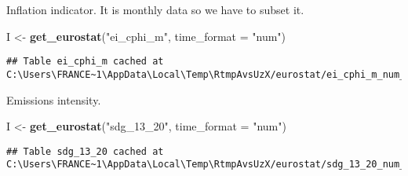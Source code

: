 \documentclass[
]{article}
\newenvironment{Shaded}{\begin{snugshade}}{\end{snugshade}}
\newcommand{\DataTypeTok}[1]{\textcolor[rgb]{0.13,0.29,0.53}{#1}}
\newcommand{\DecValTok}[1]{\textcolor[rgb]{0.00,0.00,0.81}{#1}}
\newcommand{\KeywordTok}[1]{\textcolor[rgb]{0.13,0.29,0.53}{\textbf{#1}}}
\newcommand{\NormalTok}[1]{#1}
\newcommand{\OperatorTok}[1]{\textcolor[rgb]{0.81,0.36,0.00}{\textbf{#1}}}
\newcommand{\OtherTok}[1]{\textcolor[rgb]{0.56,0.35,0.01}{#1}}
\newcommand{\StringTok}[1]{\textcolor[rgb]{0.31,0.60,0.02}{#1}}
\begin{document}
Inflation indicator. It is monthly data so we have to subset it.

\begin{Shaded}
\begin{Highlighting}[]
\NormalTok{I \textless{}{-}}\StringTok{ }\KeywordTok{get\_eurostat}\NormalTok{(}\StringTok{"ei\_cphi\_m"}\NormalTok{, }\DataTypeTok{time\_format =} \StringTok{"num"}\NormalTok{)}
\end{Highlighting}
\end{Shaded}

\begin{verbatim}
## Table ei_cphi_m cached at C:\Users\FRANCE~1\AppData\Local\Temp\RtmpAvsUzX/eurostat/ei_cphi_m_num_code_FF.rds
\end{verbatim}

\begin{Shaded}
\end{Shaded}

Emissions intensity.

\begin{Shaded}
\begin{Highlighting}[]
\NormalTok{I \textless{}{-}}\StringTok{ }\KeywordTok{get\_eurostat}\NormalTok{(}\StringTok{"sdg\_13\_20"}\NormalTok{, }\DataTypeTok{time\_format =} \StringTok{"num"}\NormalTok{)}
\end{Highlighting}
\end{Shaded}

\begin{verbatim}
## Table sdg_13_20 cached at C:\Users\FRANCE~1\AppData\Local\Temp\RtmpAvsUzX/eurostat/sdg_13_20_num_code_FF.rds
\end{verbatim}
\end{document}

